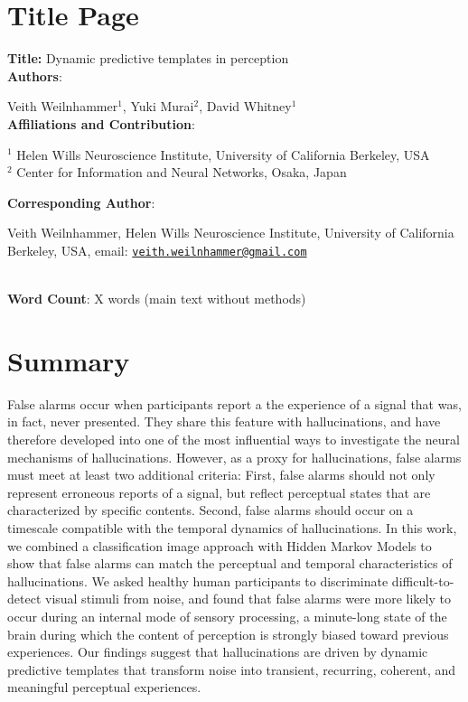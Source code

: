 \documentclass[
]{article}
\author{}
\date{\vspace{-2.5em}}
\begin{document}
\hypertarget{title-page}{%
\section{Title Page}\label{title-page}}

\textbf{Title:} Dynamic predictive templates in perception\\

\textbf{Authors}:

Veith Weilnhammer\(^{1}\), Yuki Murai\(^{2}\), David Whitney\(^{1}\)\\

\hfill\break
\textbf{Affiliations and Contribution}:

\(^{1}\) Helen Wills Neuroscience Institute, University of California
Berkeley, USA\\
\(^{2}\) Center for Information and Neural Networks, Osaka, Japan\\

\hfill\break

\textbf{Corresponding Author}:

Veith Weilnhammer, Helen Wills Neuroscience Institute, University of
California Berkeley, USA, email:
\href{mailto:veith.weilnhammer@gmail.com}{\nolinkurl{veith.weilnhammer@gmail.com}}\\
\strut \\
\textbf{Word Count}: X words (main text without methods)\\

\newpage
\linenumbers

\hypertarget{summary}{%
\section{Summary}\label{summary}}

False alarms occur when participants report a the experience of a signal
that was, in fact, never presented. They share this feature with
hallucinations, and have therefore developed into one of the most
influential ways to investigate the neural mechanisms of hallucinations.
However, as a proxy for hallucinations, false alarms must meet at least
two additional criteria: First, false alarms should not only represent
erroneous reports of a signal, but reflect perceptual states that are
characterized by specific contents. Second, false alarms should occur on
a timescale compatible with the temporal dynamics of hallucinations. In
this work, we combined a classification image approach with Hidden
Markov Models to show that false alarms can match the perceptual and
temporal characteristics of hallucinations. We asked healthy human
participants to discriminate difficult-to-detect visual stimuli from
noise, and found that false alarms were more likely to occur during an
internal mode of sensory processing, a minute-long state of the brain
during which the content of perception is strongly biased toward
previous experiences. Our findings suggest that hallucinations are
driven by dynamic predictive templates that transform noise into
transient, recurring, coherent, and meaningful perceptual experiences.
\end{document}
